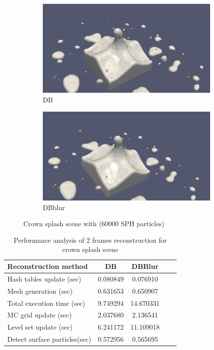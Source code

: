 \begin{figure}
	\begin{center}
       \begin{subfigure}[b]{\textwidth}
               \includegraphics[width=\textwidth]{figures/CrownOriginal2.png}
				\caption{DB}
        \end{subfigure}
        \begin{subfigure}[b]{\textwidth}
               \includegraphics[width=\textwidth]{figures/CrownBlurred2.png}
				\caption{DBblur}
        \end{subfigure}
        \caption{Crown splash scene with (60000 SPH particles)}
        \label{fig:CrownScene}
	\end{center}
\end{figure}
\begin{table}[H]
	\begin{center}
		\scriptsize
		\begin{tabular}{|l|c|c|c|c|}
			\hline
			Reconstruction method & DB & DBBlur\\
			\hline
			Hash tables update (sec)		&	0.080849	&	0.076910	\\
			Mesh generation	(sec)			&	0.631653	&	0.650907	\\
			Total execution time (sec)		&	9.749294	&	14.670331	\\
			MC grid update (sec)			&	2.037680	&	2.136541	\\
			Level set update (sec)			&	6.241172	&	11.109018	\\
			Detect surface particles(sec)	&	0.572956	&	0.565695	\\
			\hline
		\end{tabular}
	\end{center}
	\caption{Performance analysis of 2 frames reconstruction for crown splash scene}
	\label{tab:CrownScene}
\end{table}




